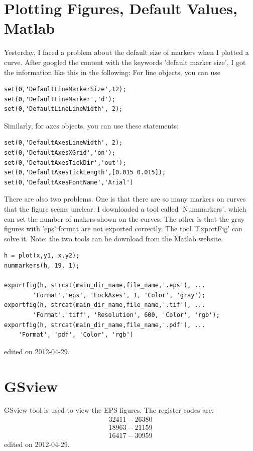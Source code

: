 \section{Plotting Figures, Default Values, Matlab}
Yesterday, I faced a problem about the default size of markers when I plotted a curve. After googled the content with the keywords 'default marker size', I got the information like this in the following:
For line objects, you can use
\begin{verbatim}
set(0,'DefaultLineMarkerSize',12);
set(0,'DefaultLineMarker','d');
set(0,'DefaultLineLineWidth', 2);
\end{verbatim}
Similarly, for axes objects, you can use these statements:
\begin{verbatim}
set(0,'DefaultAxesLineWidth', 2);
set(0,'DefaultAxesXGrid','on');
set(0,'DefaultAxesTickDir','out');
set(0,'DefaultAxesTickLength',[0.015 0.015]);
set(0,'DefaultAxesFontName','Arial')
\end{verbatim}
There are also two problems. One is that there are so many markers on curves that the figure seems unclear. I downloaded a tool called 'Nummarkers', which can set the number of makers shown on the curves. The other is that the gray figures with 'eps' format are not exported correctly. The tool 'ExportFig' can solve it. Note: the two tools can be download from the Matlab website.
\begin{verbatim}
h = plot(x,y1, x,y2);
nummarkers(h, 19, 1);

exportfig(h, strcat(main_dir_name,file_name,'.eps'), ... 
        'Format','eps', 'LockAxes', 1, 'Color', 'gray');
exportfig(h, strcat(main_dir_name,file_name,'.tif'), ...
        'Format','tiff', 'Resolution', 600, 'Color', 'rgb');
exportfig(h, strcat(main_dir_name,file_name,'.pdf'), ... 
    'Format', 'pdf', 'Color', 'rgb')
\end{verbatim}
\hfill {\tiny edited on 2012-04-29.}

\section{GSview}
GSview tool is used to view the EPS figures. The register codes are:
\begin{align*}
32411-26380\\
18963-21159\\
16417-30959
\end{align*}
\hfill {\tiny edited on 2012-04-29.}

